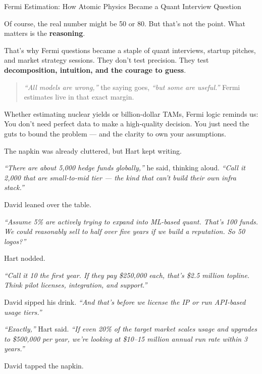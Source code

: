 \begin{HistoricalSidebar}{Fermi Estimation: How Atomic Physics Became a Quant Interview Question}
  \medskip
  
  Of course, the real number might be 50 or 80. But that’s not the point.  
  What matters is the \textbf{reasoning}.
  
  \medskip
  
  That’s why Fermi questions became a staple of quant interviews, startup pitches, and market strategy sessions.  
  They don’t test precision.  
  They test \textbf{decomposition, intuition, and the courage to guess}.
  
  \begin{quote}
  \textit{“All models are wrong,”} the saying goes, \textit{“but some are useful.”}  
  Fermi estimates live in that exact margin.
  \end{quote}
  
  \medskip
  
  Whether estimating nuclear yields or billion-dollar TAMs, Fermi logic reminds us:  
  You don’t need perfect data to make a high-quality decision.  
  You just need the guts to bound the problem — and the clarity to own your assumptions.
  
\end{HistoricalSidebar}
  



The napkin was already cluttered, but Hart kept writing.

\textit{``There are about 5{,}000 hedge funds globally,''} he said, thinking aloud. \textit{``Call it 2{,}000 
that are small-to-mid tier — the kind that can’t build their own infra stack.''}

David leaned over the table.

\textit{``Assume 5\% are actively trying to expand into ML-based quant. That’s 100 funds.  
We could reasonably sell to half over five years if we build a reputation. So 50 logos?''}

Hart nodded.

\textit{``Call it 10 the first year. If they pay \$250{,}000 each, that’s \$2.5 million topline.  
Think pilot licenses, integration, and support.''}

David sipped his drink. \textit{``And that’s before we license the IP or run API-based usage tiers.''}

\textit{``Exactly,''} Hart said. \textit{``If even 20\% of the target market scales usage and upgrades to \$500{,}000 per year,  
we’re looking at \$10–15 million annual run rate within 3 years.''}

David tapped the napkin.

